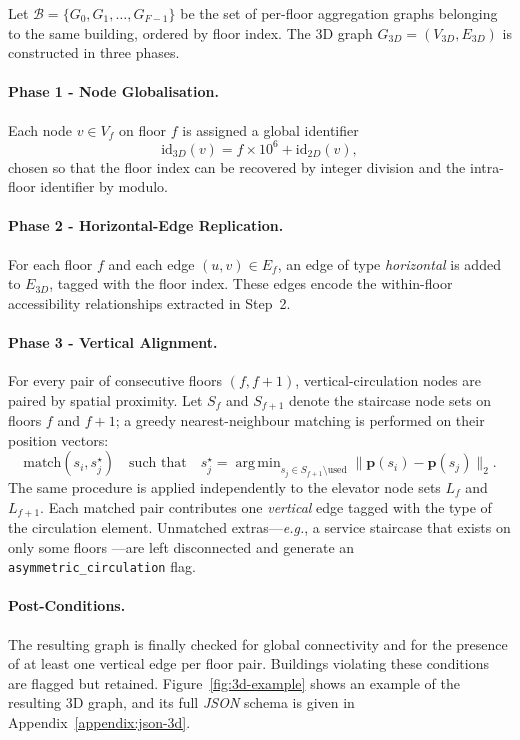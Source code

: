 \documentclass[12pt,a4paper,openright]{report}
\DeclareMathOperator*{\argmin}{arg\,min}
\newcommand{\eg}{\textit{e.g.}}
\newcommand{\code}[1]{\texttt{#1}}
\begin{document}
Let $\mathcal{B} = \{G_0, G_1, \ldots, G_{F-1}\}$ be the set of per-floor aggregation graphs belonging to the same building, ordered by floor index. The 3D graph $G_{3D} = (V_{3D}, E_{3D})$ is constructed in three phases.

\paragraph{Phase 1 - Node Globalisation.} Each node $v \in V_{f}$ on floor $f$ is assigned a global identifier
\[
    \mathrm{id}_{3D}(v) = f \times 10^{6} + \mathrm{id}_{2D}(v),
\]
chosen so that the floor index can be recovered by integer division and the intra-floor identifier by modulo.

\paragraph{Phase 2 - Horizontal-Edge Replication.} For each floor $f$ and each edge $(u, v) \in E_{f}$, an edge of type \emph{horizontal} is added to $E_{3D}$, tagged with the floor index. These edges encode the within-floor accessibility relationships extracted in Step~2.

\paragraph{Phase 3 - Vertical Alignment.} For every pair of consecutive floors $(f, f+1)$, vertical-circulation nodes are paired by spatial proximity. Let $S_{f}$ and $S_{f+1}$ denote the staircase node sets on floors $f$ and $f+1$; a greedy nearest-neighbour matching is performed on their position vectors:
\[
    \mathrm{match}(s_i, s_j^{\star}) \quad \text{such that} \quad
    s_j^{\star} = \argmin_{s_j \in S_{f+1} \setminus \mathrm{used}} \lVert \mathbf{p}(s_i) - \mathbf{p}(s_j) \rVert_{2}.
\]
The same procedure is applied independently to the elevator node sets $L_{f}$ and $L_{f+1}$. Each matched pair contributes one \emph{vertical} edge tagged with the type of the circulation element. Unmatched extras---\eg, a service staircase that exists on only some floors ---are left disconnected and generate an \code{asymmetric\_circulation} flag.

\paragraph{Post-Conditions.} The resulting graph is finally checked for global connectivity and for the presence of at least one vertical edge per floor pair. Buildings violating these conditions are flagged but retained. Figure~\ref{fig:3d-example} shows an example of the resulting 3D graph, and its full \textit{JSON} schema is given in Appendix~\ref{appendix:json-3d}.
\end{document}
